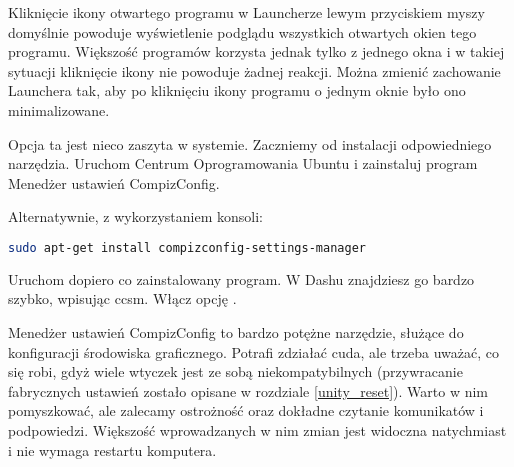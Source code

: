 Kliknięcie ikony otwartego programu w Launcherze lewym przyciskiem myszy domyślnie powoduje wyświetlenie podglądu wszystkich otwartych okien tego programu. Większość programów korzysta jednak tylko z jednego okna i w takiej sytuacji kliknięcie ikony nie powoduje żadnej reakcji. Można zmienić zachowanie Launchera tak, aby po kliknięciu ikony programu o jednym oknie było ono minimalizowane.

Opcja ta jest nieco zaszyta w systemie. Zaczniemy od instalacji odpowiedniego narzędzia. Uruchom \textcolor{ubuntu_orange}{Centrum Oprogramowania Ubuntu} i zainstaluj program \textcolor{ubuntu_orange}{Menedżer ustawień CompizConfig}.

Alternatywnie, z wykorzystaniem konsoli:
\begin{lstlisting}[language=bash]
sudo apt-get install compizconfig-settings-manager
\end{lstlisting}

Uruchom dopiero co zainstalowany program. W Dashu znajdziesz go bardzo szybko, wpisując \textcolor{ubuntu_orange}{ccsm}. Włącz opcję .

Menedżer ustawień CompizConfig to bardzo potężne narzędzie, służące do konfiguracji środowiska graficznego. Potrafi zdziałać cuda, ale trzeba uważać, co się robi, gdyż wiele wtyczek jest ze sobą niekompatybilnych (przywracanie fabrycznych ustawień zostało opisane w rozdziale \ref{unity_reset}). Warto w nim pomyszkować, ale zalecamy ostrożność oraz dokładne czytanie komunikatów i podpowiedzi. Większość wprowadzanych w nim zmian jest widoczna natychmiast i nie wymaga restartu komputera.
